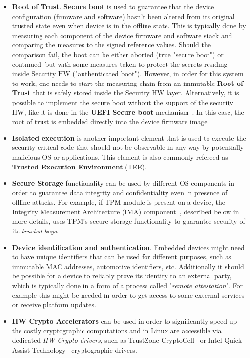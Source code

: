 \begin{itemize}
	\item \textbf{Root of Trust}. \textbf{Secure boot} is used to guarantee that the device configuration (firmware and software) hasn't been altered from its original trusted state even when device is in the offline state. This is typically done by measuring each component of the device firmware and software stack and comparing the measures to the signed reference values. Should the comparison fail, the boot can be either aborted (true "secure boot") or continued, but with some measures taken to protect the secrets residing inside Security HW ("authenticated boot"). However, in order for this system to work, one needs to start the measuring chain from an immutable \textbf{Root of Trust} that is safely stored inside the Security HW layer. Alternatively, it is possible to implement the secure boot without the support of the security HW, like it is done in the \textbf{UEFI Secure boot} mechanism~\cite{uefi}. In this case, the root of trust is embedded directly into the device firmware image. 
	\item \textbf{Isolated execution} is another important element that is used to execute the security-critical code that should not be observable in any way by potentially malicious OS or applications. This element is also commonly refereed as \textbf{Trusted Execution Environment} (TEE).
	\item \textbf{Secure Storage} functionality can be used by different OS components in order to guarantee data integrity and confidentiality even in presence of offline attacks. For example, if TPM module is present on a device, the Integrity Measurement Architecture (IMA) component~\cite{ima}, described below in more details, uses TPM's secure storage functionality to guarantee security of its \textit{trusted keys}.
	\item \textbf{Device identification and authentication}. Embedded devices might need to have unique identifiers that can be used for different purposes, such as immutable MAC addresses, automotive identifiers, etc.  Additionally it should be possible for a device to reliably prove its identity to an external party, which is typically done in a form of a process called "\textit{remote attestation}". For example this might be needed in order to get access to some external services or receive platform updates.
	\item \textbf{HW Crypto Accelerators} can be used in order to significantly speed up the costly cryptographic computations and in Linux are accessible via dedicated \textit{HW Crypto drivers}, such as TrustZone CryptoCell~\cite{cryptocell} or Intel Quick Assist Technology~\cite{intelQAT} cryptographic drivers.
\end{itemize}

